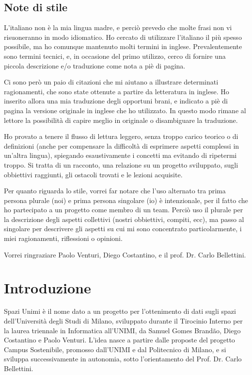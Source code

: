 \documentclass[12pt]{report}
\begin{document}
\section*{Note di stile}
L'italiano non è la mia lingua madre, e perciò prevedo che molte frasi
non vi risuoneranno in modo idiomatico. Ho cercato di utilizzare l'italiano
il più spesso possibile, ma ho comunque mantenuto molti termini in inglese.
Prevalentemente sono termini tecnici, e, in occasione del primo utilizzo,
cerco di fornire una piccola descrizione e/o traduzione come nota a piè di
pagina.

Ci sono però un paio di citazioni che mi aiutano a illustrare determinati
ragionamenti, che sono state ottenute a partire da letteratura in inglese.
Ho inserito allora una mia traduzione degli opportuni brani, e indicato
a piè di pagina la versione originale in inglese che ho utilizzato. In questo
modo rimane al lettore la possibilità di capire meglio in originale
o disambiguare la traduzione.  

Ho provato a tenere il flusso di lettura leggero, senza troppo carico
teorico o di definizioni (anche per compensare la difficoltà di esprimere
aspetti complessi in un'altra lingua), spiegando esaustivamente i 
concetti ma evitando di ripetermi troppo. Si tratta di un racconto, 
una relazione su un progetto sviluppato, sugli obbiettivi raggiunti, 
gli ostacoli trovati e le lezioni acquisite.

Per quanto riguarda lo stile, vorrei far notare che l'uso alternato tra prima
persona plurale (noi) e prima persona singolare (io) è intenzionale, per
il fatto che ho partecipato a un progetto come membro di un team. Perciò
uso il plurale per la descrizione degli aspetti collettivi 
(nostri obbiettivi, compiti, ecc), ma passo al singolare per descrivere gli
aspetti su cui mi sono concentrato particolarmente, i miei
ragionamenti, riflessioni o opinioni.

%
%
Vorrei ringraziare Paolo Venturi, Diego Costantino, 
e il prof. Dr. Carlo Bellettini. 
\afterpreface


% 
% 
\chapter{Introduzione}
\label{cap:intro}

Spazi Unimi è il nome dato a un progetto per l'ottenimento di dati sugli 
spazi dell’Università degli Studi di Milano, sviluppato durante il 
Tirocinio Interno per la laurea triennale in Informatica all’UNIMI, 
da Samuel Gomes Brandão, Diego Costantino e Paolo Venturi. L'idea 
nasce a partire dalle proposte del progetto Campus Sostenibile, 
promosso dall’UNIMI e dal Politecnico di Milano, e si sviluppa 
successivamente in autonomia, sotto l'orientamento del Prof. Dr. Carlo Bellettini.
\end{document}
